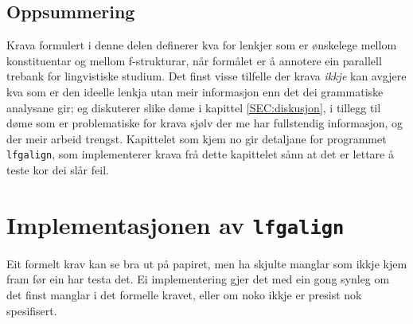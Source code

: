 \documentclass[11pt,a4paper,oneside,draft]{book}
\begin{document}
\section{Oppsummering}
\label{sec-3.9}

Krava formulert i denne delen definerer kva for lenkjer som er
ønskelege mellom konstituentar og mellom f-strukturar, når formålet er
å annotere ein parallell trebank for lingvistiske studium. Det finst
visse tilfelle der krava \emph{ikkje} kan avgjere kva som er den ideelle
lenkja utan meir informasjon enn det dei grammatiske analysane gir; eg
diskuterer slike døme i kapittel \ref{SEC:diskusjon}, i tillegg til
døme som er problematiske for krava sjølv der me har fullstendig
informasjon, og der meir arbeid trengst. Kapittelet som kjem no gir
detaljane for programmet \texttt{lfgalign}, som implementerer krava frå dette
kapittelet sånn at det er lettare å teste kor dei slår feil.


\chapter{Implementasjonen av \texttt{lfgalign}}
\label{sec-4}

\label{SEC:implementasjon}


Eit formelt krav kan se bra ut på papiret, men ha skjulte manglar som
ikkje kjem fram før ein har testa det.  Ei implementering gjer det med
ein gong synleg om det finst manglar i det formelle kravet, eller om
noko ikkje er presist nok spesifisert.
\end{document}
